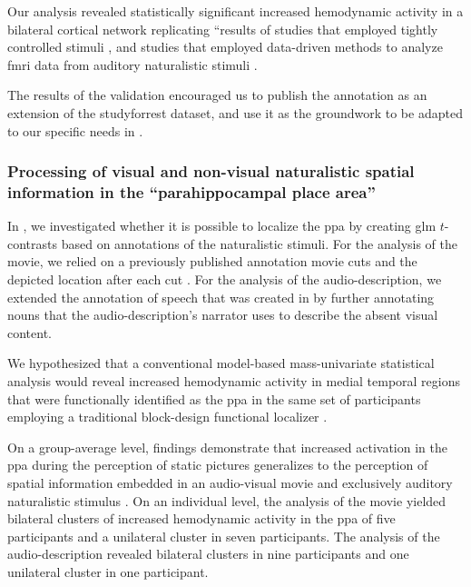 
Our analysis revealed statistically significant increased hemodynamic activity
in a bilateral cortical network replicating ``results of studies that employed
tightly controlled stimuli \citep[s.][for reviews]{friederici2011brain,
hickok2007cortical,price2012twentyyears}, and studies that employed data-driven
methods to analyze \ac{fmri} data from auditory naturalistic stimuli
\citep{honey2012not, lerner2011topographic, silbert2014coupled}.

The results of the validation encouraged us to publish the annotation as an
extension of the studyforrest dataset, and use it as the groundwork to be
adapted to our specific needs in \citet{haeusler2022processing}.



\subsubsection{Processing of visual and non-visual naturalistic spatial
information in the ``parahippocampal place area''}


In \citet{haeusler2022processing}, we investigated whether it is possible to
localize the \ac{ppa} by creating \ac{glm} $t$-contrasts based on annotations of
the naturalistic stimuli.
For the analysis of the movie, we relied on a previously published annotation
movie cuts and the depicted location after each cut \citep{haeusler2016cutanno}.
For the analysis of the audio-description, we extended the annotation of speech
that was created in \citet{haeusler2021speechanno} by further annotating nouns
that the audio-description's narrator uses to describe the absent visual
content.

We hypothesized that a conventional model-based mass-univariate statistical
analysis would reveal increased hemodynamic activity in medial temporal regions
that were functionally identified as the \ac{ppa} in the same set of
participants employing a traditional block-design functional localizer
\citep{sengupta2016extension}.



On a group-average level, findings demonstrate that increased activation in the
\ac{ppa} during the perception of static pictures generalizes to the perception
of spatial information embedded in an audio-visual movie and exclusively
auditory naturalistic stimulus \citep{haeusler2022processing}.
On an individual level, the analysis of the movie yielded bilateral
clusters of increased hemodynamic activity in the \ac{ppa} of five participants
and a unilateral cluster in seven participants.
%
The analysis of the audio-description revealed bilateral clusters in nine
participants and one unilateral cluster in one participant.

